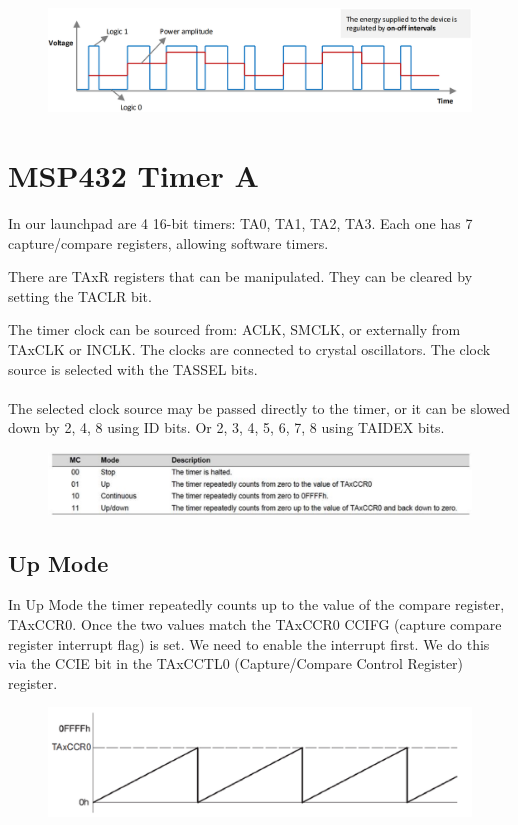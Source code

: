 \begin{figure}[H]
    \centering
    \includegraphics[width=0.75\linewidth]{img/image67.png}
\end{figure}

\section{MSP432 Timer A}
In our launchpad are 4 16-bit timers: TA0, TA1, TA2, TA3. Each one has 7 capture/compare registers,
allowing software timers.

There are TAxR registers that can be manipulated. They can be cleared by setting the TACLR bit.

The timer clock can be sourced from: ACLK, SMCLK, or externally from TAxCLK or INCLK. The clocks
are connected to crystal oscillators. The clock source is selected with the TASSEL bits.
\paragraph{}
The selected clock source may be passed directly to the timer, or it can be slowed down by 2, 4, 8 using
ID bits. Or 2, 3, 4, 5, 6, 7, 8 using TAIDEX bits.

\begin{figure}[H]
    \centering
    \includegraphics[width=0.75\linewidth]{img/image68.png}
\end{figure}

\subsection{Up Mode}
In Up Mode the timer repeatedly counts up to the value of the compare register, TAxCCR0.
Once the two values match the TAxCCR0 CCIFG (capture compare register interrupt flag) is set.
We need to enable the interrupt first. We do this via the CCIE bit in the TAxCCTL0 (Capture/Compare
Control Register) register.

\begin{figure}[H]
    \centering
    \includegraphics[width=0.75\linewidth]{img/image69.png}
\end{figure}

